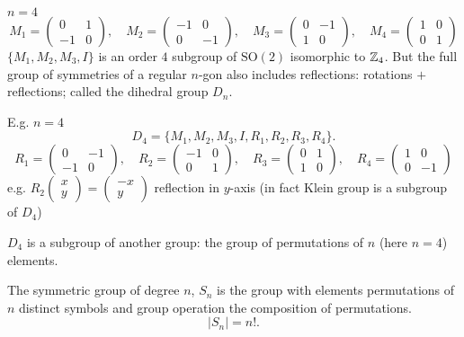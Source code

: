 \documentclass[10pt, a4paper]{article}
\begin{document}
$n = 4$
\[
M_1 = \begin{pmatrix}
    0 & 1 \\ -1 & 0
\end{pmatrix},\quad M_2 = \begin{pmatrix}
    -1 & 0 \\ 0 & -1
\end{pmatrix},\quad M_3 = \begin{pmatrix}
    0 & -1 \\ 1 & 0
\end{pmatrix},\quad M_4 = \begin{pmatrix}
    1 & 0 \\ 0 & 1
\end{pmatrix}
\]
$\{M_1, M_2, M_3, I\}$ is an order $4$ subgroup of $\mathrm{SO}(2)$ isomorphic to $\mathbb{Z}_4$.
But the full group of symmetries of a regular $n$-gon also includes reflections:
rotations $+$ reflections;
called the dihedral group $D_n$.

E.g.
$n = 4$
\[
D_4 = \{M_1, M_2, M_3, I, R_1, R_2, R_3, R_4\}.
\]
\[
R_1 = \begin{pmatrix}
    0 & -1 \\ -1 & 0
\end{pmatrix},\quad R_2 = \begin{pmatrix}
    -1 & 0 \\ 0 & 1
\end{pmatrix},\quad R_3 = \begin{pmatrix}
    0 & 1 \\ 1 & 0
\end{pmatrix},\quad R_4 = \begin{pmatrix}
    1 & 0 \\ 0 & -1
\end{pmatrix}
\]
e.g. $R_2\begin{pmatrix}
    x \\ y
\end{pmatrix} = \begin{pmatrix}
    -x \\ y
\end{pmatrix}$ reflection in $y$-axis
(in fact Klein group is a subgroup of $D_4$)

$D_4$ is a subgroup of another group:
the group of permutations of $n$
(here $n = 4$)
elements.

\begin{definition}
    The symmetric group of degree $n$,
    $S_n$ is the group with elements permutations of $n$ distinct symbols and group operation the composition of permutations.
    \[
    |S_n| = n!.
    \]
\end{definition}
\end{document}
